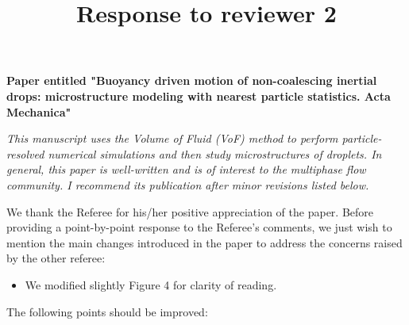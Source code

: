 \documentclass[10pt,a4paper]{article}
\begin{document}
\title{Response to reviewer 2} 
\maketitle
\textbf{Paper entitled "Buoyancy driven motion of non-coalescing inertial drops: microstructure modeling with nearest particle statistics.
Acta Mechanica"}
\bigskip

\textit{This manuscript uses the Volume of Fluid (VoF) method to perform particle-resolved numerical simulations and then study microstructures of droplets. In general, this paper is well-written and is of interest to the multiphase flow community. I recommend its publication after minor revisions listed below.}


\color{blue}
We thank the Referee for his/her positive appreciation of the paper. 
Before providing a point-by-point response to the Referee’s comments, we just wish to mention the main changes 
introduced in the paper to address the concerns raised by the other referee: 
\begin{itemize}
    \item  We modified slightly Figure 4 for clarity of reading. 
\end{itemize}


The following points should be improved:
\end{document}
